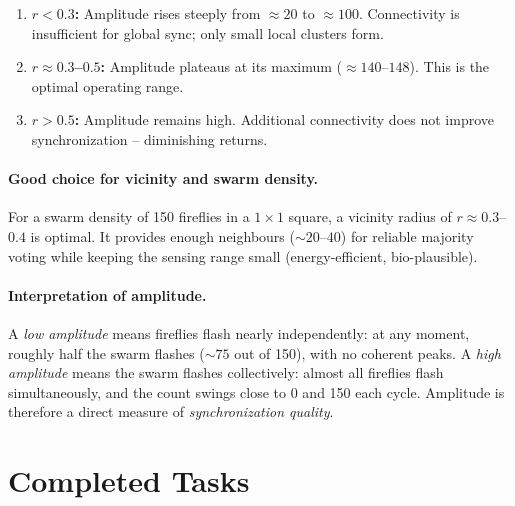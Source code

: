 \documentclass[12pt, a4paper]{article}
\begin{document}
\begin{enumerate}
    \item \textbf{$r < 0.3$:} Amplitude rises steeply from $\approx 20$ to
          $\approx 100$.  Connectivity is insufficient for global sync; only
          small local clusters form.
    \item \textbf{$r \approx 0.3$--$0.5$:} Amplitude plateaus at its maximum
          ($\approx 140$--$148$).  This is the optimal operating range.
    \item \textbf{$r > 0.5$:} Amplitude remains high.  Additional connectivity
          does not improve synchronization -- diminishing returns.
\end{enumerate}

\paragraph{Good choice for vicinity and swarm density.}
For a swarm density of 150 fireflies in a $1\times1$ square, a vicinity radius
of $r \approx 0.3$--$0.4$ is optimal.  It provides enough neighbours
(${\sim}20$--$40$) for reliable majority voting while keeping the sensing
range small (energy-efficient, bio-plausible).

\paragraph{Interpretation of amplitude.}
A \emph{low amplitude} means fireflies flash nearly independently: at any
moment, roughly half the swarm flashes (${\sim}75$ out of 150), with no
coherent peaks.  A \emph{high amplitude} means the swarm flashes
collectively: almost all fireflies flash simultaneously, and the count swings
close to 0 and 150 each cycle.  Amplitude is therefore a direct measure of
\emph{synchronization quality}.

\newpage
\section{Completed Tasks}
\end{document}
